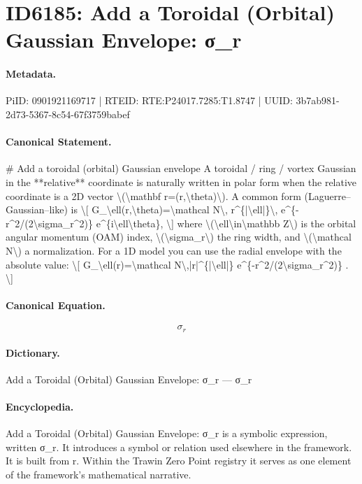 \section*{ID6185: Add a Toroidal (Orbital) Gaussian Envelope: σ\_r}
\paragraph{Metadata.}
PiID: 0901921169717 | RTEID: RTE:P24017.7285:T1.8747 | UUID: 3b7ab981-2d73-5367-8c54-67f3759babef

\paragraph{Canonical Statement.}
\# Add a toroidal (orbital) Gaussian envelope A toroidal / ring / vortex Gaussian in the **relative** coordinate is naturally written in polar form when the relative coordinate is a 2D vector \textbackslash{}(\textbackslash{}mathbf r=(r,\textbackslash{}theta)\textbackslash{}). A common form (Laguerre–Gaussian–like) is \textbackslash{}[ G\_\textbackslash{}ell(r,\textbackslash{}theta)=\textbackslash{}mathcal N\textbackslash{}, r\textasciicircum{}\{|\textbackslash{}ell|\}\textbackslash{}, e\textasciicircum{}\{-r\textasciicircum{}2/(2\textbackslash{}sigma\_r\textasciicircum{}2)\} e\textasciicircum{}\{i\textbackslash{}ell\textbackslash{}theta\}, \textbackslash{}] where \textbackslash{}(\textbackslash{}ell\textbackslash{}in\textbackslash{}mathbb Z\textbackslash{}) is the orbital angular momentum (OAM) index, \textbackslash{}(\textbackslash{}sigma\_r\textbackslash{}) the ring width, and \textbackslash{}(\textbackslash{}mathcal N\textbackslash{}) a normalization. For a 1D model you can use the radial envelope with the absolute value: \textbackslash{}[ G\_\textbackslash{}ell(r)=\textbackslash{}mathcal N\textbackslash{},|r|\textasciicircum{}\{|\textbackslash{}ell|\} e\textasciicircum{}\{-r\textasciicircum{}2/(2\textbackslash{}sigma\_r\textasciicircum{}2)\} . \textbackslash{}]

\paragraph{Canonical Equation.}
\[
\sigma_r
\]

\paragraph{Dictionary.}
Add a Toroidal (Orbital) Gaussian Envelope: σ\_r — σ\_r

\paragraph{Encyclopedia.}
Add a Toroidal (Orbital) Gaussian Envelope: σ\_r is a symbolic expression, written σ\_r. It introduces a symbol or relation used elsewhere in the framework. It is built from r. Within the Trawin Zero Point registry it serves as one element of the framework's mathematical narrative.
